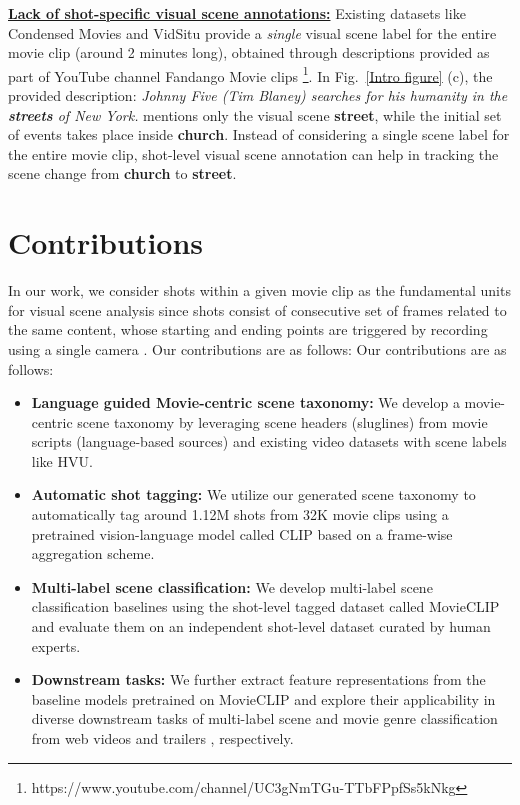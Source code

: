 \textbf{\underline{Lack of shot-specific visual scene annotations:}} Existing datasets like Condensed Movies \cite{bain2020condensed} and VidSitu \cite{Sadhu_2021_CVPR} provide a {\em single} visual scene label for the entire movie clip (around 2 minutes long), obtained through descriptions provided as part of YouTube channel Fandango Movie clips \footnote{https://www.youtube.com/channel/UC3gNmTGu-TTbFPpfSs5kNkg}. In Fig.~\ref{Intro figure} (c), the provided description: \textit{Johnny Five (Tim Blaney) searches for his humanity in the \textbf{streets} of New York.} mentions only the visual scene \textbf{street}, while the initial set of events takes place inside \textbf{church}. Instead of considering a single scene label for the entire movie clip, shot-level visual scene annotation can help in tracking the scene change from \textbf{church} to \textbf{street}.
\section{Contributions}
In our work, we consider shots within a given movie clip as the fundamental units for visual scene analysis since shots consist of consecutive set of frames related to the same content, whose starting and ending points are triggered by recording using a single camera \cite{SBD}. Our contributions are as follows:
Our contributions are as follows:
\begin{itemize}
\item \textbf{Language guided Movie-centric scene taxonomy:} We develop a movie-centric scene taxonomy by leveraging scene headers (sluglines) from movie scripts (language-based sources) and existing video datasets with scene labels like HVU\cite{diba_large_2020}. 
\item \textbf{Automatic shot tagging:} We utilize our generated scene taxonomy to automatically tag around 1.12M shots from 32K movie clips using a pretrained vision-language model called CLIP \cite{CLIP} based on a frame-wise aggregation scheme.  
\item \textbf{Multi-label scene classification:} We develop multi-label scene classification baselines using the shot-level tagged dataset called MovieCLIP and evaluate them on an independent shot-level dataset curated by human experts. 
\item \textbf{Downstream tasks:} We further extract feature representations from the baseline models pretrained on MovieCLIP and explore their applicability in diverse downstream tasks of multi-label scene and movie genre classification from web videos \cite{diba_large_2020} and trailers \cite{2019Moviescope}, respectively. 
\end{itemize}
